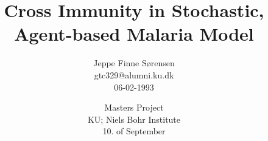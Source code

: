 \documentclass[a4paper,11pt]{report} %
\numberwithin{equation}{section}
\begin{document}
\printlength{\textwidth}

\title{Cross Immunity in Stochastic, Agent-based Malaria Model}
\author{Jeppe Finne Sørensen \\ gtc329@alumni.ku.dk \\ 06-02-1993}
\date{Masters Project \\ KU; Niels Bohr Institute \\ 10. of September}

\maketitle
\thispagestyle{empty}

\newpage	
\end{document}

